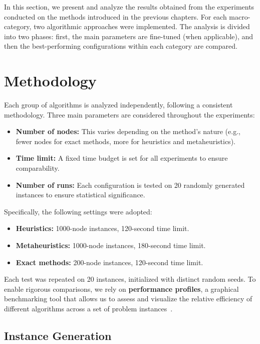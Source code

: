 In this section, we present and analyze the results obtained from the experiments conducted on the methods introduced in the previous chapters. For each macro-category, two algorithmic approaches were implemented. The analysis is divided into two phases: first, the main parameters are fine-tuned (when applicable), and then the best-performing configurations within each category are compared.

\section{Methodology}

Each group of algorithms is analyzed independently, following a consistent methodology. Three main parameters are considered throughout the experiments:
\begin{itemize}
    \item \textbf{Number of nodes:} This varies depending on the method's nature (e.g., fewer nodes for exact methods, more for heuristics and metaheuristics).
    \item \textbf{Time limit:} A fixed time budget is set for all experiments to ensure comparability.
    \item \textbf{Number of runs:} Each configuration is tested on 20 randomly generated instances to ensure statistical significance.
\end{itemize}

Specifically, the following settings were adopted:
\begin{itemize}
    \item \textbf{Heuristics:} 1000-node instances, 120-second time limit.
    \item \textbf{Metaheuristics:} 1000-node instances, 180-second time limit.
    \item \textbf{Exact methods:} 200-node instances, 120-second time limit.
\end{itemize}

Each test was repeated on 20 instances, initialized with distinct random seeds. To enable rigorous comparisons, we rely on \textbf{performance profiles}, a graphical benchmarking tool that allows us to assess and visualize the relative efficiency of different algorithms across a set of problem instances~\cite{dolan2002performance}.

\subsection{Instance Generation}

